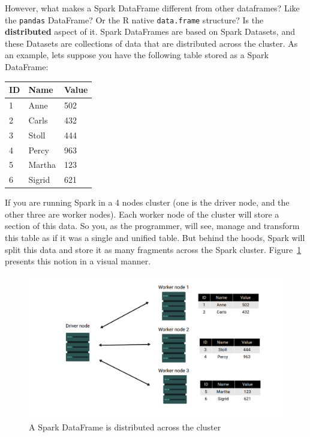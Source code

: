 \documentclass[
  11pt,
  letterpaper,
  DIV=11,
  numbers=noendperiod]{scrreprt}
\begin{document}
However, what makes a Spark DataFrame different from other dataframes?
Like the \texttt{pandas} DataFrame? Or the R native \texttt{data.frame}
structure? Is the \textbf{distributed} aspect of it. Spark DataFrames
are based on Spark Datasets, and these Datasets are collections of data
that are distributed across the cluster. As an example, lets suppose you
have the following table stored as a Spark DataFrame:

\begin{longtable}[]{@{}lll@{}}
\toprule()
ID & Name & Value \\
\midrule()
\endhead
1 & Anne & 502 \\
2 & Carls & 432 \\
3 & Stoll & 444 \\
4 & Percy & 963 \\
5 & Martha & 123 \\
6 & Sigrid & 621 \\
\bottomrule()
\end{longtable}

If you are running Spark in a 4 nodes cluster (one is the driver node,
and the other three are worker nodes). Each worker node of the cluster
will store a section of this data. So you, as the programmer, will see,
manage and transform this table as if it was a single and unified table.
But behind the hoods, Spark will split this data and store it as many
fragments across the Spark cluster. Figure~\ref{fig-distributed-df}
presents this notion in a visual manner.

\begin{figure}

{\centering \includegraphics{Chapters/../Figures/distributed-df.png}

}

\caption{\label{fig-distributed-df}A Spark DataFrame is distributed
across the cluster}

\end{figure}
\end{document}
